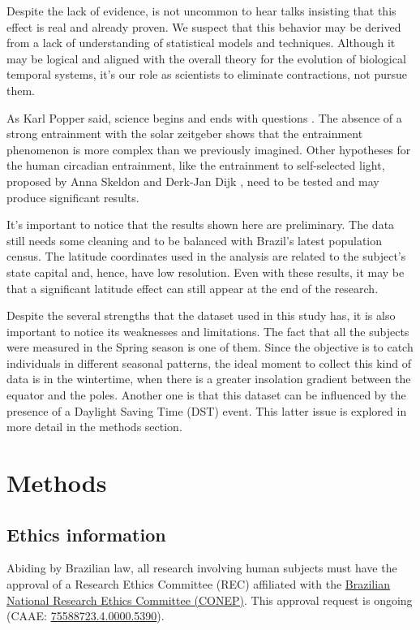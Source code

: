 \documentclass[
12pt,
openright,
oneside,
a4paper,
chapter=TITLE,
section=TITLE,
french,
spanish,
brazil,
english
]{abntex2}\usepackage{array}
\begin{document}
Despite the lack of evidence, is not uncommon to hear talks insisting
that this effect is real and already proven. We suspect that this
behavior may be derived from a lack of understanding of statistical
models and techniques. Although it may be logical and aligned with the
overall theory for the evolution of biological temporal systems, it's
our role as scientists to eliminate contractions, not pursue them.

As Karl Popper said, science begins and ends with questions
\autocite{popper1979}. The absence of a strong entrainment with the
solar zeitgeber shows that the entrainment phenomenon is more complex
than we previously imagined. Other hypotheses for the human circadian
entrainment, like the entrainment to self-selected light, proposed by
Anna Skeldon and Derk-Jan Dijk \autocite*{skeldon2021}, need to be
tested and may produce significant results.

It's important to notice that the results shown here are preliminary.
The data still needs some cleaning and to be balanced with Brazil's
latest population census. The latitude coordinates used in the analysis
are related to the subject's state capital and, hence, have low
resolution. Even with these results, it may be that a significant
latitude effect can still appear at the end of the research.

Despite the several strengths that the dataset used in this study has,
it is also important to notice its weaknesses and limitations. The fact
that all the subjects were measured in the Spring season is one of them.
Since the objective is to catch individuals in different seasonal
patterns, the ideal moment to collect this kind of data is in the
wintertime, when there is a greater insolation gradient between the
equator and the poles. Another one is that this dataset can be
influenced by the presence of a Daylight Saving Time (DST) event. This
latter issue is explored in more detail in the methods section.

\section{Methods}\label{methods}

\subsection{Ethics information}\label{ethics-information}

Abiding by Brazilian law, all research involving human subjects must
have the approval of a Research Ethics Committee (REC) affiliated with
the
\href{https://conselho.saude.gov.br/Web_comissoes/conep/index.html}{Brazilian
National Research Ethics Committee (CONEP)}. This approval request is
ongoing (CAAE:
\href{https://plataformabrasil.saude.gov.br/login.jsf}{75588723.4.0000.5390}).
\end{document}
